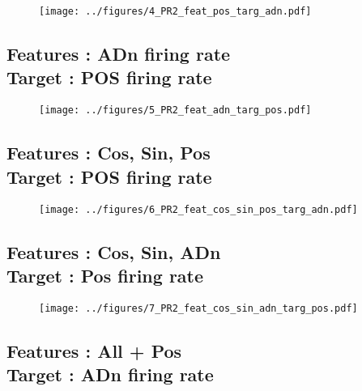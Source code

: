 \documentclass[10pt,a4paper]{article}
\begin{document}
\begin{figure}[htbp]
	\begin{center}
		\texttt{[image: ../figures/4\_PR2\_feat\_pos\_targ\_adn.pdf]} 
	\end{center}
\end{figure}

\subsection{Features : ADn firing rate \\ Target : POS firing rate}

\begin{figure}[htbp]
	\begin{center}
		\texttt{[image: ../figures/5\_PR2\_feat\_adn\_targ\_pos.pdf]} 
	\end{center}
\end{figure}

\subsection{Features : Cos, Sin, Pos \\ Target : POS firing rate}

\begin{figure}[htbp]
	\begin{center}
		\texttt{[image: ../figures/6\_PR2\_feat\_cos\_sin\_pos\_targ\_adn.pdf]} 
	\end{center}
\end{figure}

\subsection{Features : Cos, Sin, ADn \\ Target : Pos firing rate}

\begin{figure}[htbp]
	\begin{center}
		\texttt{[image: ../figures/7\_PR2\_feat\_cos\_sin\_adn\_targ\_pos.pdf]} 
	\end{center}
\end{figure}

\subsection{Features : All + Pos \\ Target : ADn firing rate}
\end{document}
